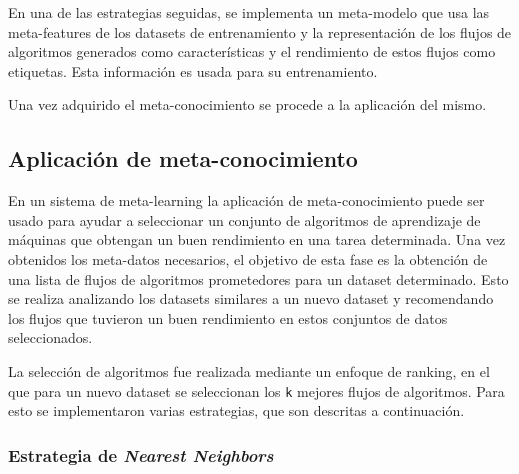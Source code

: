 En una de las estrategias seguidas, se implementa un meta-modelo que usa las meta-features de los datasets de entrenamiento y la representación de los flujos de algoritmos generados como características y el rendimiento de estos flujos como etiquetas. Esta información es usada para su entrenamiento.

Una vez adquirido el meta-conocimiento se procede a la aplicación del mismo.

\subsection{Aplicación de meta-conocimiento}\label{sub:aplicacion}


En un sistema de meta-learning la aplicación de meta-conocimiento puede ser usado para ayudar a seleccionar un conjunto de algoritmos de aprendizaje de máquinas que obtengan un buen rendimiento en una tarea determinada. Una vez obtenidos los meta-datos necesarios, el objetivo de esta fase es la obtención de una lista de flujos de algoritmos prometedores para un dataset determinado. Esto se realiza analizando los datasets similares a un nuevo dataset y recomendando los flujos que tuvieron un buen rendimiento en estos conjuntos de datos seleccionados. 

La selección de algoritmos fue realizada mediante un enfoque de ranking, en el que para un nuevo dataset se seleccionan los \texttt{k} mejores flujos de algoritmos. Para esto se implementaron varias estrategias, que son descritas a continuación.

\subsubsection{Estrategia de \textit{Nearest Neighbors}}


